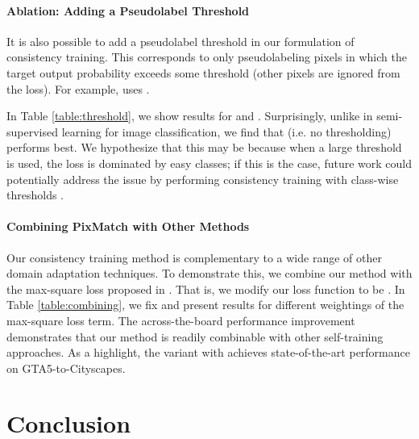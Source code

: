 \documentclass[final]{cvpr}
\begin{document}
\paragraph{Ablation: Adding a Pseudolabel Threshold} 

It is also possible to add a pseudolabel threshold in our formulation of consistency training. This corresponds to only pseudolabeling pixels in which the target output probability exceeds some threshold  (other pixels are ignored from the loss). For example, \cite{fixmatch} uses . 

In Table \ref{table:threshold}, we show results for  and . Surprisingly, unlike in semi-supervised learning for image classification, we find that  (i.e. no thresholding) performs best. We hypothesize that this may be because when a large threshold is used, the loss is dominated by easy classes; if this is the case, future work could potentially address the issue by performing consistency training with class-wise thresholds \cite{cbst}. 




















\paragraph{Combining PixMatch with Other Methods}

Our consistency training method is complementary to a wide range of other domain adaptation techniques. To demonstrate this, we combine our method with the max-square loss proposed in \cite{maxsquare}. That is, we modify our loss function to be . In Table \ref{table:combining}, we fix  and present results for different weightings  of the max-square loss term. The across-the-board performance improvement demonstrates that our method is readily combinable with other self-training approaches. As a highlight, the variant with  achieves state-of-the-art performance on GTA5-to-Cityscapes. 









\section{Conclusion}
\end{document}

